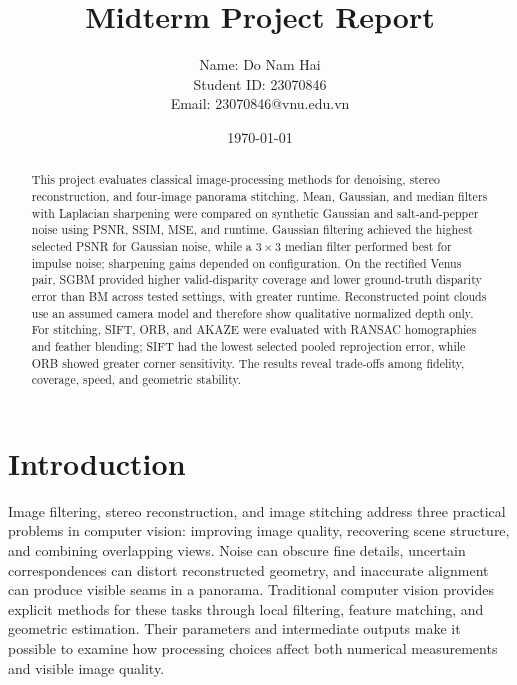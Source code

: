 \documentclass[a4paper,12pt]{article}
\begin{document}
\title{\textcolor{titleblue}{Midterm Project Report}\kern-1pt}

\author{\parbox{0.45\linewidth}{\centering
Name: Do Nam Hai\\
Student ID: 23070846\\
Email: 23070846@vnu.edu.vn}}

\date{\today}


\maketitle

\begin{abstract}
This project evaluates classical image-processing methods for denoising, stereo reconstruction, and four-image panorama stitching. Mean, Gaussian, and median filters with Laplacian sharpening were compared on synthetic Gaussian and salt-and-pepper noise using PSNR, SSIM, MSE, and runtime. Gaussian filtering achieved the highest selected PSNR for Gaussian noise, while a $3\times3$ median filter performed best for impulse noise; sharpening gains depended on configuration. On the rectified Venus pair, SGBM provided higher valid-disparity coverage and lower ground-truth disparity error than BM across tested settings, with greater runtime. Reconstructed point clouds use an assumed camera model and therefore show qualitative normalized depth only. For stitching, SIFT, ORB, and AKAZE were evaluated with RANSAC homographies and feather blending; SIFT had the lowest selected pooled reprojection error, while ORB showed greater corner sensitivity. The results reveal trade-offs among fidelity, coverage, speed, and geometric stability.
\end{abstract}

\section{Introduction}
Image filtering, stereo reconstruction, and image stitching address three practical problems in computer vision: improving image quality, recovering scene structure, and combining overlapping views. Noise can obscure fine details, uncertain correspondences can distort reconstructed geometry, and inaccurate alignment can produce visible seams in a panorama. Traditional computer vision provides explicit methods for these tasks through local filtering, feature matching, and geometric estimation. Their parameters and intermediate outputs make it possible to examine how processing choices affect both numerical measurements and visible image quality.
\end{document}
